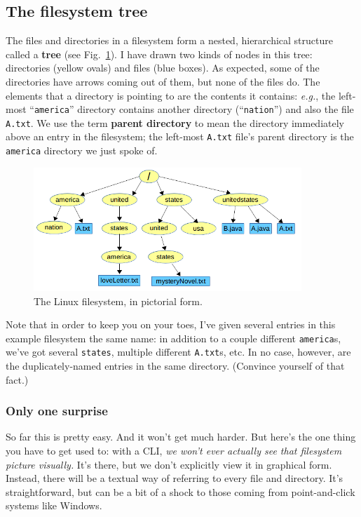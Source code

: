 \subsection{The filesystem tree}

The files and directories in a filesystem form a nested, hierarchical
structure called a \textbf{tree} (see Fig.~\ref{fig:tree}). I have drawn two
kinds of nodes in this tree: directories (yellow ovals) and files (blue
boxes). As expected, some of the directories have arrows coming out of them,
but none of the files do. The elements that a directory is pointing to are the
contents it contains: \textit{e.g.}, the left-most ``\texttt{america}''
directory contains another directory (``\texttt{nation}'') and also the file
\texttt{A.txt}. We use the term \textbf{parent directory} to mean the
directory immediately above an entry in the filesystem; the left-most
\texttt{A.txt} file's parent directory is the \texttt{america} directory we
just spoke of.

\begin{figure}[ht]
\centering
\includegraphics[width=0.9\textwidth]{tree.png}  %
\caption{The Linux filesystem, in pictorial form.}
\label{fig:tree}
\end{figure}

Note that in order to keep you on your toes, I've given several entries in
this example filesystem the same name: in addition to a couple different
\texttt{america}s, we've got several \texttt{states}, multiple different
\texttt{A.txt}s, etc. In no case, however, are the duplicately-named entries
in the same directory. (Convince yourself of that fact.)

\subsubsection{Only one surprise}

So far this is pretty easy. And it won't get much harder. But here's the one
thing you have to get used to: with a CLI, \textit{we won't ever actually see
that filesystem picture visually.} It's there, but we don't explicitly view it
in graphical form. Instead, there will be a textual way of referring to every
file and directory. It's straightforward, but can be a bit of a shock to those
coming from point-and-click systems like Windows.

